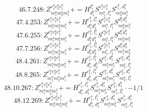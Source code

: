 \documentclass[letterpaper,10pt,fleqn,leqno,onecolumn]{article}
\begin{document}
\begin{equation} \;\;\;\;\;\;  46.7.248: Z^{e_{1}^{a}e_{2}^{a}e_{1}^{b}}_{m_{1}^{a}m_{2}^{a}m_{1}^{b}}+=H^{l_{1}^{a}}_{d_{1}^{a}}S^{e_{1}^{a}e_{2}^{a}}_{m_{1}^{a},l_{1}^{a}}S^{e_{1}^{b},d_{1}^{a}}_{m_{2}^{a}m_{1}^{b}} \end{equation}
\begin{equation} \;\;\;\;\;\;  47.4.253: Z^{e_{1}^{a}e_{2}^{a}e_{1}^{b}}_{m_{1}^{a}m_{2}^{a}m_{1}^{b}}+=H^{e_{1}^{b},l_{1}^{a}}_{d_{1}^{a}d_{1}^{b}}S^{e_{1}^{a}e_{2}^{a}}_{m_{1}^{a},l_{1}^{a}}S^{d_{1}^{a}d_{1}^{b}}_{m_{2}^{a}m_{1}^{b}} \end{equation}
\begin{equation} \;\;\;\;\;\;  47.6.255: Z^{e_{1}^{a}e_{2}^{a}e_{1}^{b}}_{m_{1}^{a}m_{2}^{a}m_{1}^{b}}+=H^{e_{1}^{a},l_{1}^{b}}_{d_{1}^{a}d_{1}^{b}}S^{e_{2}^{a}e_{1}^{b}}_{m_{1}^{a},l_{1}^{b}}S^{d_{1}^{a}d_{1}^{b}}_{m_{2}^{a}m_{1}^{b}} \end{equation}
\begin{equation} \;\;\;\;\;\;  47.7.256: Z^{e_{1}^{a}e_{2}^{a}e_{1}^{b}}_{m_{1}^{a}m_{2}^{a}m_{1}^{b}}+=H^{e_{1}^{a},l_{1}^{a}}_{d_{1}^{a}d_{2}^{a}}S^{e_{2}^{a}e_{1}^{b}}_{m_{1}^{b},l_{1}^{a}}S^{d_{1}^{a}d_{2}^{a}}_{m_{1}^{a}m_{2}^{a}} \end{equation}
\begin{equation} \;\;\;\;\;\;  48.4.261: Z^{e_{1}^{a}e_{2}^{a}e_{1}^{b}}_{m_{1}^{a}m_{2}^{a}m_{1}^{b}}+=H^{e_{1}^{b},l_{1}^{b}}_{d_{1}^{b},d_{2}^{b}}S^{e_{1}^{a},d_{1}^{b}}_{m_{1}^{a}m_{1}^{b}}S^{e_{2}^{a},d_{2}^{b}}_{m_{2}^{a},l_{1}^{b}} \end{equation}
\begin{equation} \;\;\;\;\;\;  48.8.265: Z^{e_{1}^{a}e_{2}^{a}e_{1}^{b}}_{m_{1}^{a}m_{2}^{a}m_{1}^{b}}+=H^{e_{1}^{b},l_{1}^{a}}_{d_{1}^{b},d_{1}^{a}}S^{e_{1}^{a},d_{1}^{b}}_{m_{1}^{a}m_{1}^{b}}S^{e_{2}^{a},d_{1}^{a}}_{m_{2}^{a},l_{1}^{a}} \end{equation}
\begin{equation} \;\;\;\;\;\;  48.10.267: Z^{e_{1}^{a}e_{2}^{a}e_{1}^{b}}_{m_{1}^{a}m_{2}^{a}m_{1}^{b}}+=H^{e_{1}^{b},l_{1}^{a}}_{d_{1}^{a},d_{1}^{b}}S^{e_{1}^{a},d_{1}^{a}}_{m_{1}^{a}m_{2}^{a}}S^{e_{2}^{a},d_{1}^{b}}_{m_{1}^{b},l_{1}^{a}}\cdot -1/1 \end{equation}
\begin{equation} \;\;\;\;\;\;  48.12.269: Z^{e_{1}^{a}e_{2}^{a}e_{1}^{b}}_{m_{1}^{a}m_{2}^{a}m_{1}^{b}}+=H^{e_{1}^{a},l_{1}^{b}}_{d_{1}^{b},d_{1}^{a}}S^{e_{2}^{a},d_{1}^{b}}_{m_{1}^{a}m_{1}^{b}}S^{e_{1}^{b},d_{1}^{a}}_{m_{2}^{a},l_{1}^{b}} \end{equation}
\end{document}
